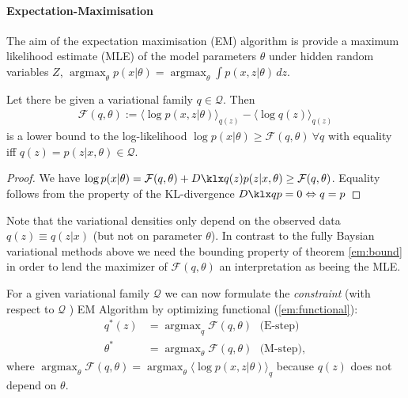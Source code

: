   
\paragraph{Expectation-Maximisation}
The aim of the expectation maximisation (EM) algorithm is provide a maximum likelihood estimate (MLE) of the model parameters $\theta$ under hidden random variables $Z$, $\operatorname{argmax}_\theta p(x | \theta)  = \operatorname{argmax}_\theta \int p(x, z | \theta)\,dz$.


\begin{theorem} \label{em:bound}
	Let there be given a variational family $q\in\mathcal Q$. Then 
	\begin{align} \label{em:functional}
			\mathcal{F}(q, \theta) :=  \langle \log p(x,z | \theta) \rangle _{q(z)} - \langle \log q(z) \rangle _{q(z)} 
	\end{align}
	is a lower bound to the log-likelihood $\log p(x|\theta) \geq \mathcal{F}(q, \theta) ~ \forall q $ with equality iff $q(z)=p(z|x,\theta) \in \mathcal Q$.
\end{theorem}
\begin{proof}
	We have 	$\log p(x | \theta) = \mathcal{F}(q, \theta) + \kl{q(z)}{p(z|x, \theta)} \geq \mathcal{F}(q, \theta)$. Equality follows from the property of the KL-divergence  $\kl{q}{p} = 0 \Leftrightarrow q=p$
\end{proof}

Note that the variational densities only depend on the observed data $q(z) \equiv q(z|x)$ (but not on parameter $\theta$). In contrast to the fully Baysian variational methods above we need the bounding property of theorem \ref{em:bound} in order to lend the maximizer of $\mathcal{F}(q, \theta)$ an interpretation as beeing the MLE. 

For a given variational family $\mathcal Q$ we can now formulate the \textit{constraint} (with respect to $\mathcal Q$ ) EM Algorithm \cite{Beal03variationalalgorithms} by optimizing functional (\ref{em:functional}):
\begin{align}
q^*(z) & =  \operatorname{argmax}_q  \mathcal F (q, \theta) \text{~ (E-step)}\\
\theta^* &= \operatorname{argmax}_\theta  \mathcal F (q, \theta)  \text{~ (M-step)},  
\end{align}
where $\operatorname{argmax}_\theta  \mathcal F (q, \theta)  =	\operatorname{argmax}_\theta \langle \log p(x, z | \theta) \rangle_{q}$ because $q(z)$ does not depend on $\theta$.

